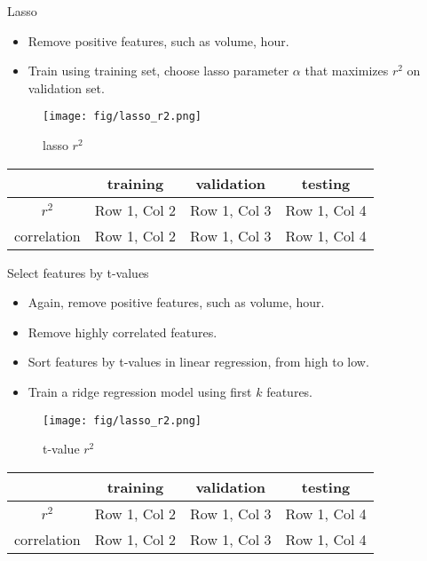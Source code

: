 \documentclass[10pt]{beamer}
\begin{document}
\begin{frame}{Lasso}


\begin{itemize}
    \item Remove positive features, such as volume, hour.
    \item Train using training set, choose lasso parameter $\alpha$ that maximizes $r^2$ on validation set.
\end{itemize}

\begin{figure}
    \centering
    \texttt{[image: fig/lasso\_r2.png]}
    \caption{lasso $r^2$}
\end{figure}


\begin{table}[h!]
\centering
\begin{tabular}{c|c|c|c}
\hline
 & \textbf{training} & \textbf{validation} & \textbf{testing} \\ \hline
$r^2$      & Row 1, Col 2      & Row 1, Col 3      & Row 1, Col 4      \\ \hline
correlation      & Row 1, Col 2      & Row 1, Col 3      & Row 1, Col 4      \\ \hline
\end{tabular}
\end{table}


\end{frame}

\begin{frame}{Select features by t-values}

\begin{itemize}
    \item Again, remove positive features, such as volume, hour.
    \item Remove highly correlated features.
    \item Sort features by t-values in linear regression, from high to low.
    \item Train a ridge regression model using first $k$ features.
\end{itemize}
\begin{figure}
    \centering
    \texttt{[image: fig/lasso\_r2.png]}
    \caption{t-value $r^2$}
\end{figure}


\begin{table}[h!]
\centering
\begin{tabular}{c|c|c|c}
\hline
 & \textbf{training} & \textbf{validation} & \textbf{testing} \\ \hline
$r^2$      & Row 1, Col 2      & Row 1, Col 3      & Row 1, Col 4      \\ \hline
correlation      & Row 1, Col 2      & Row 1, Col 3      & Row 1, Col 4      \\ \hline
\end{tabular}
\end{table}


\end{frame}
\end{document}
